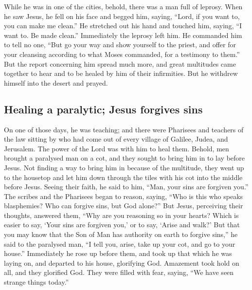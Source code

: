  While he was in one of the cities, behold, there was a
man full of leprosy. When he saw Jesus, he fell on his face and begged
him, saying, ``Lord, if you want to, you can make me clean.''
 He stretched out his hand and touched him, saying, ``I
want to. Be made clean.'' Immediately the leprosy left him.
 He commanded him to tell no one, ``But go your way and
show yourself to the priest, and offer for your cleansing according to
what Moses commanded, for a testimony to them.''  But the
report concerning him spread much more, and great multitudes came
together to hear and to be healed by him of their infirmities.
 But he withdrew himself into the desert and prayed.

\hypertarget{healing-a-paralytic-jesus-forgives-sins}{%
\subsection{Healing a paralytic; Jesus forgives
sins}\label{healing-a-paralytic-jesus-forgives-sins}}

 On one of those days, he was teaching; and there were
Pharisees and teachers of the law sitting by who had come out of every
village of Galilee, Judea, and Jerusalem. The power of the Lord was with
him to heal them.  Behold, men brought a paralysed man on
a cot, and they sought to bring him in to lay before Jesus.
 Not finding a way to bring him in because of the
multitude, they went up to the housetop and let him down through the
tiles with his cot into the middle before Jesus.  Seeing
their faith, he said to him, ``Man, your sins are forgiven you.''
 The scribes and the Pharisees began to reason, saying,
``Who is this who speaks blasphemies? Who can forgive sins, but God
alone?''  But Jesus, perceiving their thoughts, answered
them, ``Why are you reasoning so in your hearts?  Which
is easier to say, `Your sins are forgiven you,' or to say, `Arise and
walk?'  But that you may know that the Son of Man has
authority on earth to forgive sins,'' he said to the paralysed man, ``I
tell you, arise, take up your cot, and go to your house.''
 Immediately he rose up before them, and took up that
which he was laying on, and departed to his house, glorifying God.
 Amazement took hold on all, and they glorified God. They
were filled with fear, saying, ``We have seen strange things today.''

